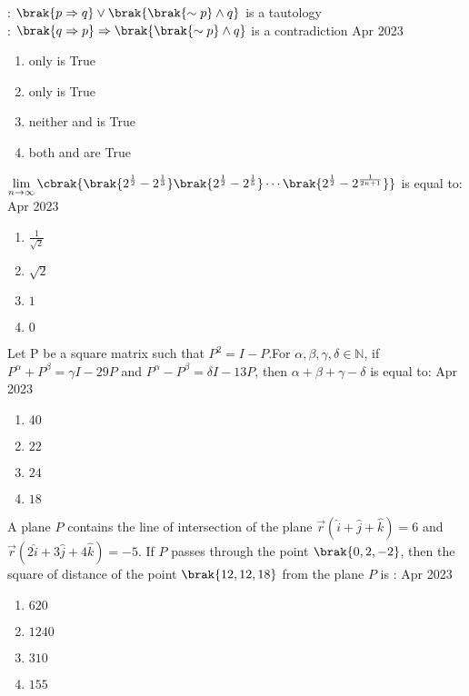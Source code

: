 	: $\brak{p \Rightarrow q} \vee \brak{\brak{\sim p}\wedge q}$ is a tautology\\
		: $\brak{q \Rightarrow p} \Rightarrow \brak{\brak{\sim p}\wedge q}$ is a contradiction  \hfill{Apr 2023}
    \begin{enumerate}
	    \item only  is True
	    \item only  is True
	    \item neither  and  is True
	    \item both  and  are True
    \end{enumerate}
    \item $\displaystyle \lim_{n \to \infty} \cbrak{ \brak{ 2^{\frac{1}{2}} -2^{\frac{1}{3}}} \brak{2^{\frac{1}{2}} - 2^{\frac{1}{5}} } \cdots \brak{2^{\frac{1}{2}} - 2^{\frac{1}{2n+1}}}}$ is equal to: \hfill{Apr 2023}
    \begin{enumerate}
        \item $\frac{1}{\sqrt{2}}$
        \item $\sqrt{2}$
        \item $1$
        \item $0$
    \end{enumerate}
    \item Let P be a square matrix such that $P^2 = I-P$.For $\alpha , \beta, \gamma, \delta \in \mathbb{N}$, if  $P^{\alpha}+P^{\beta}=\gamma I-29 P$ and $P^{\alpha}-P^{\beta}=\delta I-13P$, then $\alpha +\beta+ \gamma-\delta$ is equal to: \hfill{Apr 2023}
	    \begin{enumerate}
        \item $40$    
 \item $22$    
        \item $24$     
        \item $18$     
    \end{enumerate}    
   \item A plane $P$ contains the line of intersection of the plane $ \overrightarrow{r} ( \hat {i} + \hat{j} + \hat{k}) = 6$ and $\overrightarrow{r} (2\hat {i} + 3\hat{j} + 4\hat{k}) = -5 $. If  $P$ passes through the point  $\brak{0, 2, -2}$, then the square of distance of the point $\brak{12, 12, 18}$ from the plane $P$ is : \hfill{Apr 2023}
\begin{enumerate}
        \item $620$                   
        \item $1240$          
        \item $310$     
        \item $155$     
    \end{enumerate}
